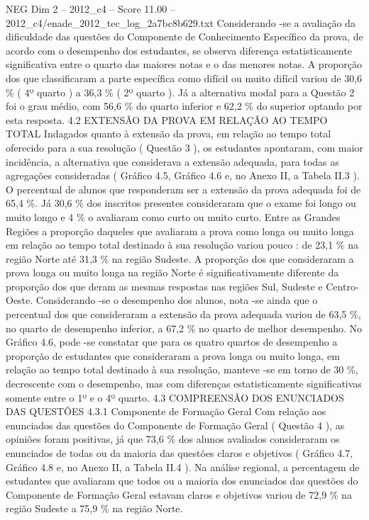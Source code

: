 \begin{textsample}{NEG Dim 2 – 2012\_c4 – Score 11.00 – 2012\_c4/enade\_2012\_tec\_log\_2a7bc8b629.txt}
Considerando -se a avaliação da dificuldade das questões do Componente de Conhecimento Específico da prova, de acordo com o desempenho dos estudantes, se observa diferença estatisticamente significativa entre o quarto das maiores notas e o das menores notas.
A proporção dos que classificaram a parte específica como difícil ou muito difícil variou de 30,6 \% ( 4º quarto ) a 36,3 \% ( 2º quarto ).
Já a alternativa modal para a Questão 2 foi o grau médio, com 56,6 \% do quarto inferior e 62,2 \% do superior optando por esta resposta. 4.2 EXTENSÃO DA PROVA EM RELAÇÃO AO TEMPO TOTAL Indagados quanto à extensão da prova, em relação ao tempo total oferecido para a sua resolução ( Questão 3 ), os estudantes apontaram, com maior incidência, a alternativa que considerava a extensão adequada, para todas as agregações consideradas ( Gráfico 4.5, Gráfico 4.6 e, no Anexo II, a Tabela II.3 ).
O percentual de alunos que responderam ser a extensão da prova adequada foi de 65,4 \%.
Já 30,6 \% dos inscritos presentes consideraram que o exame foi longo ou muito longo e 4 \% o avaliaram como curto ou muito curto.
Entre as Grandes Regiões a proporção daqueles que avaliaram a prova como longa ou muito longa em relação ao tempo total destinado à sua resolução variou pouco : de 23,1 \% na região Norte até 31,3 \% na região Sudeste.
A proporção dos que consideraram a prova longa ou muito longa na região Norte é significativamente diferente da proporção dos que deram as mesmas respostas nas regiões Sul, Sudeste e Centro-Oeste.
Considerando -se o desempenho dos alunos, nota -se ainda que o percentual dos que consideraram a extensão da prova adequada variou de 63,5 \%, no quarto de desempenho inferior, a 67,2 \% no quarto de melhor desempenho.
No Gráfico 4.6, pode -se constatar que para os quatro quartos de desempenho a proporção de estudantes que consideraram a prova longa ou muito longa, em relação ao tempo total destinado à sua resolução, manteve -se em torno de 30 \%, decrescente com o desempenho, mas com diferenças estatisticamente significativas somente entre o 1º e o 4º quarto. 4.3 COMPREENSÃO DOS ENUNCIADOS DAS QUESTÕES 4.3.1 Componente de Formação Geral Com relação aos enunciados das questões do Componente de Formação Geral ( Questão 4 ), as opiniões foram positivas, já que 73,6 \% dos alunos avaliados consideraram os enunciados de todas ou da maioria das questões claros e objetivos ( Gráfico 4.7, Gráfico 4.8 e, no Anexo II, a Tabela II.4 ).
Na análise regional, a percentagem de estudantes que avaliaram que todos ou a maioria dos enunciados das questões do Componente de Formação Geral estavam claros e objetivos variou de 72,9 \% na região Sudeste a 75,9 \% na região Norte.

\end{textsample}
